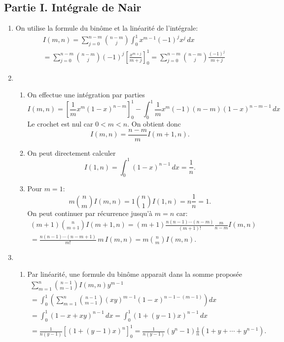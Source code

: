 \subsection*{Partie I. Intégrale de Nair}
\begin{enumerate}
 \item On utilise la formule du binôme et la linéarité de l'intégrale:
\begin{multline*}
 I(m,n)= \sum_{j=0}^{n-m}\binom{n-m}{j}\int_0^1x^{m-1}(-1)^jx^j\,dx\\
= \sum_{j=0}^{n-m}\binom{n-m}{j}(-1)^j\left[ \frac{x^{m+j}}{m+j}\right]_0^1
= \sum_{j=0}^{n-m}\binom{n-m}{j}\frac{(-1)^{j}}{m+j}
\end{multline*}

 \item 
 \begin{enumerate}
 \item On effectue une intégration par parties
\begin{displaymath}
 I(m,n) = \left[ \frac{1}{m}x^m(1-x)^{n-m}\right]_0^1
-\int_0^1\frac{1}{m}x^m(-1)(n-m)(1-x)^{n-m-1}\,dx 
\end{displaymath}
Le crochet est nul car $0<m<n$. On obtient donc
\begin{displaymath}
 I(m,n) = \frac{n-m}{m}I(m+1,n).
\end{displaymath}


 \item On peut directement calculer
\begin{displaymath}
 I(1,n)=\int_0^1(1-x)^{n-1}\,dx = \frac{1}{n}.
\end{displaymath}

 \item Pour $m=1$:
\begin{displaymath}
 m\binom{n}{m}I(m,n)=1 \binom{n}{1}I(1,n)=n\frac{1}{n}= 1.
\end{displaymath}
On peut continuer par récurrence jusqu'à $m=n$ car:
\begin{multline*}
 (m+1)\binom{n}{m+1}I(m+1,n)
=(m+1)\frac{n(n-1)\cdots(n-m)}{(m+1)!}\frac{m}{n-m}I(m,n)\\
=\frac{n(n-1)\cdots(n-m+1)}{m!}\,m\,I(m,n)=m\binom{n}{m}I(m,n).
\end{multline*}

\end{enumerate}
 
 \item  
\begin{enumerate}
 \item Par linéarité, une formule du binôme apparait dans la somme proposée
\begin{multline*}
  \sum_{m=1}^{n}\binom{n-1}{m-1}I(m,n)y^{m-1}\\
=\int_0^1 \left(\sum_{m=1}^n \binom{n-1}{m-1}(xy)^{m-1}(1-x)^{n-1-(m-1)} \right) dx \\
= \int_0^1(1-x+xy)^{n-1}\,dx = \int_0^1(1+(y-1)x)^{n-1}\,dx \\
=\frac{1}{n(y-1)}\left[ (1+(y-1)x)^n\right]_0^1 =  \frac{1}{n(y-1)}(y^n-1)
\frac{1}{n}\left(1+y+\cdots+y^{n-1} \right) .
\end{multline*}


\end{enumerate}
\end{enumerate}
